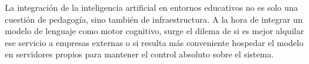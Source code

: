 La integración de la inteligencia artificial en entornos educativos no es solo una cuestión de pedagogía, sino también de infraestructura. A la hora de integrar un modelo de lenguaje como motor cognitivo, surge el dilema de si es mejor alquilar ese servicio a empresas externas o si resulta más conveniente hospedar el modelo en servidores propios para mantener el control absoluto sobre el sistema.